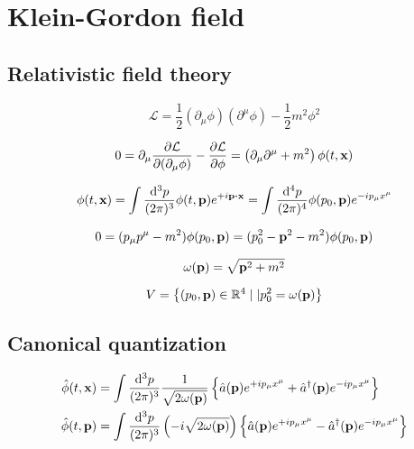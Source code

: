 \section{Klein-Gordon field}

\subsection{Relativistic field theory}

\begin{equation}
	\mathcal{L}
	=
	\frac{1}{2}
	\left(\partial_\mu\phi\right)
	\left(\partial^\mu\phi\right)
	-
	\frac{1}{2}
	m^2\phi^2
	\label{eq:kg_lagrangian}
\end{equation}

\begin{equation}
	0
	=
	\partial_\mu\pdv{\mathcal{L}}{(\partial_\mu\phi)}
	-
	\pdv{\mathcal{L}}{\phi}
	=
	\left(\partial_\mu\partial^\mu+m^2\right)
	\phi(t,\vb{x})
	\label{eq:kg_eom}
\end{equation}

\begin{equation}
	\phi(t,\vb{x})
	=
	\int\frac{\dd[3]{p}}{(2\pi)^3}
	\phi(t,\vb{p})e^{+i\vb{p}\vdot\vb{x}}
	=
	\int\frac{\dd[4]{p}}{(2\pi)^4}
	\phi(p_0,\vb{p})e^{-ip_\mu x^\mu}
	\label{eq:kg_ft}
\end{equation}

\begin{equation}
	0
	=
	(p_\mu p^\mu-m^2)\phi(p_0,\vb{p})
	=
	(p_0^2-\vb{p}^2-m^2)\phi(p_0,\vb{p})
	\label{eq:kg_eom_ft}
\end{equation}

\begin{equation}
	\omega(\vb{p})
	=
	\sqrt{\vb{p}^2+m^2}
	\label{eq:energy_momentum}
\end{equation}

\begin{equation}
	V
	=
	\left\{
		(p_0,\vb{p})\in\mathbb{R}^4
		\mid\vert
		p_0^2=\omega(\vb{p})
	\right\}
\end{equation}

\subsection{Canonical quantization}

\begin{align}
	\hat\phi(t,\vb{x})
	&=
	\int\frac{\dd[3]{p}}{(2\pi)^3}
	\frac{1}{\sqrt{2\omega(\vb{p})}}
	\left\{
		\hat{a}(\vb{p})
		e^{+ip_\mu x^\mu}
		+
		\hat{a}^\dagger(\vb{p})
		e^{-ip_\mu x^\mu}
	\right\}
	\label{eq:kg_pos}
	\\
	\hat\phi(t,\vb{p})
	&=
	\int\frac{\dd[3]{p}}{(2\pi)^3}
	\left(-i\sqrt{2\omega(\vb{p})}\right)
	\left\{
		\hat{a}(\vb{p})
		e^{+ip_\mu x^\mu}
		-
		\hat{a}^\dagger(\vb{p})
		e^{-ip_\mu x^\mu}
	\right\}
	\label{eq:kg_mom}
\end{align}


